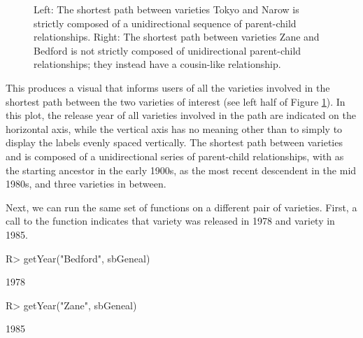 \documentclass[article,shortnames]{jss}
\begin{document}
\begin{figure}[h]
    \centering
    \caption{Left: The shortest path between varieties Tokyo and Narow is strictly composed of a unidirectional sequence of parent-child relationships. Right: The shortest path between varieties Zane and Bedford is not strictly composed of unidirectional parent-child relationships; they instead have a cousin-like relationship.}
    \label{fig:pathTNZB}
\end{figure}

This produces a visual that informs users of all the varieties involved in the shortest path between the two varieties of interest (see left half of Figure \ref{fig:pathTNZB}). In this plot, the release year of all varieties involved in the path are indicated on the horizontal axis, while the vertical axis has no meaning other than to simply to display the labels evenly spaced vertically. The shortest path between varieties  and  is composed of a unidirectional series of parent-child relationships, with  as the starting ancestor in the early 1900s,  as the most recent descendent in the mid 1980s, and three varieties in between.

Next, we can run the same set of functions on a different pair of varieties. First, a call to the  function  indicates that variety  was released in 1978 and variety  in 1985.

\begin{CodeChunk}
\begin{CodeInput}
R> getYear("Bedford", sbGeneal)
\end{CodeInput}
\begin{CodeOutput}
[1] 1978
\end{CodeOutput}
\begin{CodeInput}
R> getYear("Zane", sbGeneal)
\end{CodeInput}
\begin{CodeOutput}
[1] 1985
\end{CodeOutput}
\end{CodeChunk}
\end{document}
